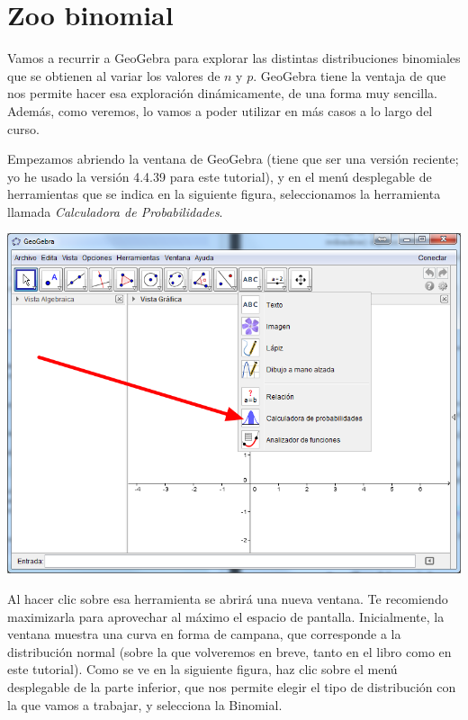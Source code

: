 \documentclass[10pt,a4paper]{article}\usepackage[]{graphicx}\usepackage[]{color}
\begin{document}
\section{Zoo binomial}

Vamos a recurrir a GeoGebra para explorar las distintas distribuciones binomiales que se obtienen al variar los valores de $n$ y $p$. GeoGebra tiene la ventaja de que nos permite hacer esa exploración dinámicamente, de una forma muy sencilla. Además, como veremos, lo vamos a poder utilizar en más casos a lo largo del curso.

Empezamos abriendo la ventana de GeoGebra (tiene que ser una versión reciente; yo he usado la versión 4.4.39 para este tutorial), y en el menú desplegable de herramientas que se indica en la siguiente figura, seleccionamos la herramienta llamada {\em Calculadora de Probabilidades}.

\begin{center}
    \includegraphics[width=14cm]{../fig/Tut05-22.png}
\end{center}

Al hacer clic sobre esa herramienta se abrirá una nueva ventana. Te recomiendo maximizarla para aprovechar al máximo el espacio de pantalla. Inicialmente, la ventana muestra una curva en forma de campana, que corresponde a la distribución normal (sobre la que volveremos en breve, tanto en el libro como en este tutorial). Como se ve en la siguiente figura, haz clic sobre el menú desplegable de la parte inferior, que nos permite elegir el tipo de distribución con la que vamos a trabajar, y selecciona la Binomial.
\end{document}
